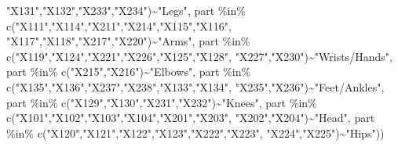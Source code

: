 \documentclass[
  letterpaper,
]{krantz}
\makeatletter
\newenvironment{Shaded}{\begin{snugshade}}{\end{snugshade}}
\newcommand{\FunctionTok}[1]{\textcolor[rgb]{0.28,0.35,0.67}{#1}}
\newcommand{\NormalTok}[1]{\textcolor[rgb]{0.00,0.23,0.31}{#1}}
\newcommand{\SpecialCharTok}[1]{\textcolor[rgb]{0.37,0.37,0.37}{#1}}
\newcommand{\StringTok}[1]{\textcolor[rgb]{0.13,0.47,0.30}{#1}}
\newenvironment{kframe}{%
\medskip{}
\setlength{\fboxsep}{.8em}
 \def\at@end@of@kframe{}%
 \ifinner\ifhmode%
  \def\at@end@of@kframe{\end{minipage}}%
  \begin{minipage}{\columnwidth}%
 \fi\fi%
 \def\FrameCommand##1{\hskip\@totalleftmargin \hskip-\fboxsep
 \colorbox{shadecolor}{##1}\hskip-\fboxsep
     \hskip-\linewidth \hskip-\@totalleftmargin \hskip\columnwidth}%
 \MakeFramed {\advance\hsize-\width
   \@totalleftmargin\z@ \linewidth\hsize
   \@setminipage}}%
 {\par\unskip\endMakeFramed%
 \at@end@of@kframe}
\renewenvironment{Shaded}{\begin{kframe}}{\end{kframe}}
\makeatother
\begin{document}
\begin{Shaded}
\begin{Highlighting}[]
                \StringTok{"X131"}\NormalTok{,}\StringTok{"X132"}\NormalTok{,}\StringTok{"X233"}\NormalTok{,}\StringTok{"X234"}\NormalTok{)}\SpecialCharTok{\textasciitilde{}}\StringTok{"Legs"}\NormalTok{,}
\NormalTok{    part }\SpecialCharTok{\%in\%} \FunctionTok{c}\NormalTok{(}\StringTok{"X111"}\NormalTok{,}\StringTok{"X114"}\NormalTok{,}\StringTok{"X211"}\NormalTok{,}\StringTok{"X214"}\NormalTok{,}\StringTok{"X115"}\NormalTok{,}\StringTok{"X116"}\NormalTok{,}
                \StringTok{"X117"}\NormalTok{,}\StringTok{"X118"}\NormalTok{,}\StringTok{"X217"}\NormalTok{,}\StringTok{"X220"}\NormalTok{)}\SpecialCharTok{\textasciitilde{}}\StringTok{"Arms"}\NormalTok{,}
\NormalTok{    part }\SpecialCharTok{\%in\%} \FunctionTok{c}\NormalTok{(}\StringTok{"X119"}\NormalTok{,}\StringTok{"X124"}\NormalTok{,}\StringTok{"X221"}\NormalTok{,}\StringTok{"X226"}\NormalTok{,}\StringTok{"X125"}\NormalTok{,}\StringTok{"X128"}\NormalTok{,}
                \StringTok{"X227"}\NormalTok{,}\StringTok{"X230"}\NormalTok{)}\SpecialCharTok{\textasciitilde{}}\StringTok{"Wrists/Hands"}\NormalTok{,}
\NormalTok{    part }\SpecialCharTok{\%in\%} \FunctionTok{c}\NormalTok{(}\StringTok{"X215"}\NormalTok{,}\StringTok{"X216"}\NormalTok{)}\SpecialCharTok{\textasciitilde{}}\StringTok{"Elbows"}\NormalTok{,}
\NormalTok{    part }\SpecialCharTok{\%in\%} \FunctionTok{c}\NormalTok{(}\StringTok{"X135"}\NormalTok{,}\StringTok{"X136"}\NormalTok{,}\StringTok{"X237"}\NormalTok{,}\StringTok{"X238"}\NormalTok{,}\StringTok{"X133"}\NormalTok{,}\StringTok{"X134"}\NormalTok{,}
                \StringTok{"X235"}\NormalTok{,}\StringTok{"X236"}\NormalTok{)}\SpecialCharTok{\textasciitilde{}}\StringTok{"Feet/Ankles"}\NormalTok{,}
\NormalTok{    part }\SpecialCharTok{\%in\%} \FunctionTok{c}\NormalTok{(}\StringTok{"X129"}\NormalTok{,}\StringTok{"X130"}\NormalTok{,}\StringTok{"X231"}\NormalTok{,}\StringTok{"X232"}\NormalTok{)}\SpecialCharTok{\textasciitilde{}}\StringTok{"Knees"}\NormalTok{,}
\NormalTok{    part }\SpecialCharTok{\%in\%} \FunctionTok{c}\NormalTok{(}\StringTok{"X101"}\NormalTok{,}\StringTok{"X102"}\NormalTok{,}\StringTok{"X103"}\NormalTok{,}\StringTok{"X104"}\NormalTok{,}\StringTok{"X201"}\NormalTok{,}\StringTok{"X203"}\NormalTok{,}
                \StringTok{"X202"}\NormalTok{,}\StringTok{"X204"}\NormalTok{)}\SpecialCharTok{\textasciitilde{}}\StringTok{"Head"}\NormalTok{,}
\NormalTok{    part }\SpecialCharTok{\%in\%} \FunctionTok{c}\NormalTok{(}\StringTok{"X120"}\NormalTok{,}\StringTok{"X121"}\NormalTok{,}\StringTok{"X122"}\NormalTok{,}\StringTok{"X123"}\NormalTok{,}\StringTok{"X222"}\NormalTok{,}\StringTok{"X223"}\NormalTok{,}
                \StringTok{"X224"}\NormalTok{,}\StringTok{"X225"}\NormalTok{)}\SpecialCharTok{\textasciitilde{}}\StringTok{"Hips"}\NormalTok{))}
    

\end{Highlighting}
\end{Shaded}
\end{document}

